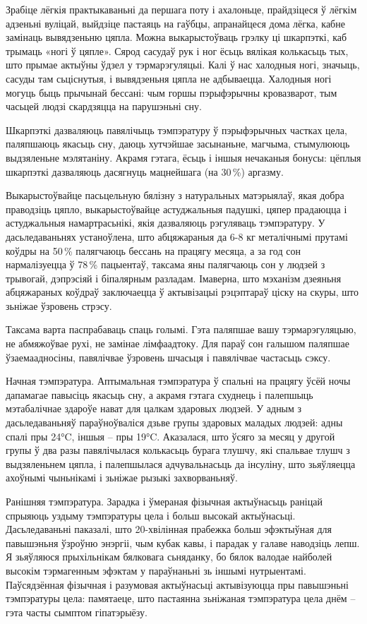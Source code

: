 Зрабіце лёгкія практыкаваньні да першага поту і ахалоньце, прайдзіцеся ў лёгкім адзеньні вуліцай, выйдзіце пастаяць на гаўбцы, апранайцеся дома лёгка, кабне замінаць вывядзеньню цяпла. Можна выкарыстоўваць грэлку ці шкарпэткі, каб трымаць «ногі ў цяпле». Сярод сасудаў рук і ног ёсьць вялікая колькасьць тых, што прымае актыўны ўдзел у тэрмарэгуляцыі. Калі ў нас халодныя ногі, значыць, сасуды там сьціснутыя, і вывядзеньня цяпла не адбываецца. Халодныя ногі могуць быць прычынай бессані: чым горшы пэрыфэрычны кровазварот, тым часьцей людзі скардзяцца на парушэньні сну.

Шкарпэткі дазваляюць павялічыць тэмпэратуру ў пэрыфэрычных частках цела, паляпшаюць якасьць сну, даюць хутчэйшае засынаньне, магчыма, стымулююць выдзяленьне мэлятаніну. Акрамя гэтага, ёсьць і іншыя нечаканыя бонусы: цёплыя шкарпэткі дазваляюць дасягнуць мацнейшага (на 30\,\%) аргазму.

Выкарыстоўвайце пасьцельную бялізну з натуральных матэрыялаў, якая добра праводзіць цяпло, выкарыстоўвайце астуджальныя падушкі, цяпер прадаюцца і астуджальныя намартрасьнікі, якія дазваляюць рэгуляваць тэмпэратуру. У дасьледаваньнях устаноўлена, што абцяжараныя да 6-8 кг металічнымі прутамі коўдры на 50\,\% палягчаюць бессань на працягу месяца, а за год сон нармалізуецца ў 78\,\% пацыентаў, таксама яны палягчаюць сон у людзей з трывогай, дэпрэсіяй і біпалярным разладам. Імаверна, што мэханізм дзеяньня абцяжараных коўдраў заключаецца ў актывізацыі рэцэптараў ціску на скуры, што зьніжае ўзровень стрэсу.

Таксама варта паспрабаваць спаць голымі. Гэта паляпшае вашу тэрмарэгуляцыю, не абмяжоўвае рухі, не замінае лімфаадтоку. Для параў сон галышом паляпшае ўзаемаадносіны, павялічвае ўзровень шчасьця і павялічвае частасьць сэксу.

Начная тэмпэратура. Аптымальная тэмпэратура ў спальні на працягу ўсёй ночы дапамагае павысіць якасьць сну, а акрамя гэтага схуднець і палепшыць мэтабалічнае здароўе нават для цалкам здаровых людзей. У адным з дасьледаваньняў параўноўваліся дзьве групы здаровых маладых людзей: адны спалі пры 24°C, іншыя – пры 19°C. Аказалася, што ўсяго за месяц у другой групы ў два разы павялічылася колькасьць бурага тлушчу, які спальвае тлушч з выдзяленьнем цяпла, і палепшылася адчувальнасьць да інсуліну, што зьяўляецца ахоўнымі чыньнікамі і зьніжае рызыкі захворваньняў.

Ранішняя тэмпэратура. Зарадка і ўмераная фізычная актыўнасьць раніцай спрыяюць уздыму тэмпэратуры цела і больш высокай актыўнасьці. Дасьледаваньні паказалі, што 20-хвілінная прабежка больш эфэктыўная для павышэньня ўзроўню энэргіі, чым кубак кавы, і парадак у галаве наводзіць лепш. Я зьяўляюся прыхільнікам бялковага сьняданку, бо бялок валодае найболей высокім тэрмагенным эфэктам у параўнаньні зь іншымі нутрыентамі. Паўсядзённая фізычная і разумовая актыўнасьці актывізуюцца пры павышэньні тэмпэратуры цела: памятаеце, што пастаянна зьніжаная тэмпэратура цела днём – гэта часты сымптом гіпатэрыёзу.

